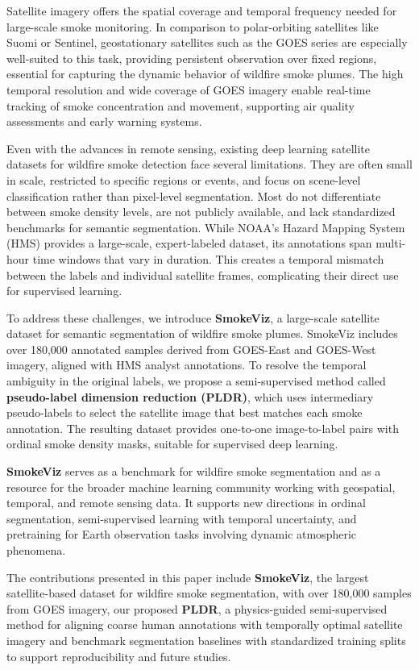 \documentclass{article}
\begin{document}
Satellite imagery offers the spatial coverage and temporal frequency needed for large-scale smoke monitoring. In comparison to polar-orbiting satellites like Suomi or Sentinel, geostationary satellites such as the GOES series \cite{goes} are especially well-suited to this task, providing persistent observation over fixed regions, essential for capturing the dynamic behavior of wildfire smoke plumes. The high temporal resolution and wide coverage of GOES imagery enable real-time tracking of smoke concentration and movement, supporting air quality assessments and early warning systems.

Even with the advances in remote sensing, existing deep learning satellite datasets for wildfire smoke detection face several limitations. They are often small in scale, restricted to specific regions or events, and focus on scene-level classification rather than pixel-level segmentation. Most do not differentiate between smoke density levels, are not publicly available, and lack standardized benchmarks for semantic segmentation. While NOAA’s Hazard Mapping System (HMS) provides a large-scale, expert-labeled dataset, its annotations span multi-hour time windows that vary in duration. This creates a temporal mismatch between the labels and individual satellite frames, complicating their direct use for supervised learning.

To address these challenges, we introduce \textbf{SmokeViz}, a large-scale satellite dataset for semantic segmentation of wildfire smoke plumes. SmokeViz includes over 180,000 annotated samples derived from GOES-East and GOES-West imagery, aligned with HMS analyst annotations. To resolve the temporal ambiguity in the original labels, we propose a semi-supervised method called \textbf{pseudo-label dimension reduction (PLDR)}, which uses intermediary pseudo-labels to select the satellite image that best matches each smoke annotation. The resulting dataset provides one-to-one image-to-label pairs with ordinal smoke density masks, suitable for supervised deep learning.

\textbf{SmokeViz} serves as a benchmark for wildfire smoke segmentation and as a resource for the broader machine learning community working with geospatial, temporal, and remote sensing data. It supports new directions in ordinal segmentation, semi-supervised learning with temporal uncertainty, and pretraining for Earth observation tasks involving dynamic atmospheric phenomena.

The contributions presented in this paper include \textbf{SmokeViz}, the largest satellite-based dataset for wildfire smoke segmentation, with over 180,000 samples from GOES imagery, our proposed \textbf{PLDR}, a physics-guided semi-supervised method for aligning coarse human annotations with temporally optimal satellite imagery and benchmark segmentation baselines with standardized training splits to support reproducibility and future studies.
\end{document}
